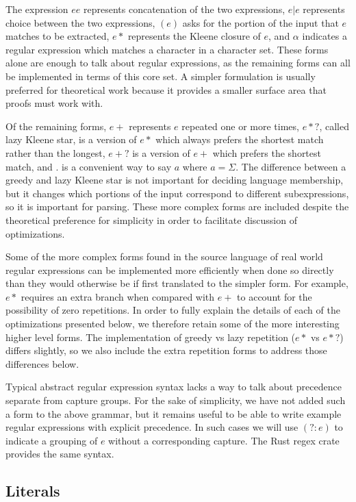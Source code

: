 The expression $e e$ represents concatenation of the two expressions,
$e|e$ represents choice between the two expressions, $(e)$ asks for the
portion of the input that $e$ matches to be extracted,
$e*$ represents the Kleene closure of $e$,
and $\alpha$ indicates a regular expression which matches a character
in a character set. These forms alone are enough to talk about regular
expressions, as the remaining forms can all be implemented in terms of this
core set. A simpler formulation is usually preferred for theoretical work
because it provides a smaller surface area that proofs must work with. 

Of the remaining forms, $e+$ represents $e$ repeated one or more times,
$e*?$, called lazy Kleene star, is a version of $e*$ which always prefers
the shortest match rather than the longest, $e+?$ is a version of
$e+$ which prefers the shortest match, and $.$ is a convenient
way to say $a$ where $a = \Sigma$. The difference between a greedy
and lazy Kleene star is not important for deciding language membership,
but it changes which portions of the input correspond to different
subexpressions, so it is important for parsing.
These more complex forms are included despite the theoretical preference
for simplicity in order to facilitate discussion of optimizations.

Some of the more complex forms found in the source language of real
world regular expressions can be implemented more efficiently 
when done so directly
than they would otherwise be if first translated to the
simpler form. For example, $e*$ requires an extra branch when compared
with $e+$ to account for the possibility of zero repetitions.
In order to fully explain the details of each of the
optimizations presented below, we therefore retain some of the more
interesting higher level forms. The implementation of greedy vs lazy
repetition ($e*$ vs $e*?$) differs slightly, so we also include the
extra repetition forms to address those differences below.

Typical abstract regular expression syntax lacks a way to talk about
precedence separate from capture groups. For the sake of simplicity,
we have not added such a form to the above grammar, but it remains
useful to be able to write example regular expressions with explicit
precedence. In such cases we will use $(?:e)$ to indicate a grouping
of $e$ without a corresponding capture. The Rust regex crate
provides the same syntax.

\subsection{Literals}

